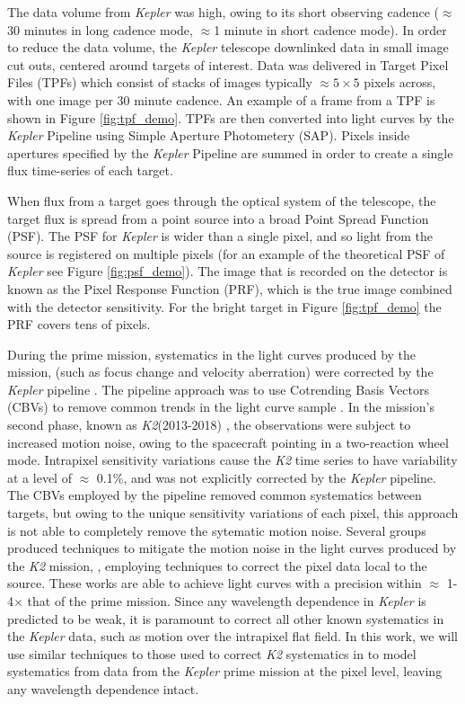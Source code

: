\documentclass[iop]{emulateapj}
\newcommand{\kepler}{\emph{Kepler}\xspace}
\newcommand{\ktwo}{\emph{K2}\xspace}
\begin{document}
The data volume from \kepler was high, owing to its short observing cadence ($\approx$30 minutes in long cadence mode, $\approx$1 minute in short cadence mode). In order to reduce the data volume, the \kepler telescope downlinked data in small image cut outs, centered around targets of interest. Data was delivered in Target Pixel Files (TPFs) which consist of stacks of images typically $\approx 5 \times 5$ pixels across, with one image per 30 minute cadence. An example of a frame from a TPF is shown in Figure \ref{fig:tpf_demo}. TPFs are then converted into light curves by the \kepler Pipeline \citep{pipeline} using Simple Aperture Photometery (SAP). Pixels inside apertures specified by the \kepler Pipeline are summed in order to create a single flux time-series of each target.

When flux from a target goes through the optical system of the telescope, the target flux is spread from a point source into a broad Point Spread Function (PSF). The PSF for \kepler is wider than a single pixel, and so light from the source is registered on multiple pixels (for an example of the theoretical PSF of \kepler see Figure \ref{fig:psf_demo}). The image that is recorded on the detector is known as the Pixel Response Function (PRF), which is the true image combined with the detector sensitivity. For the bright target in Figure \ref{fig:tpf_demo} the PRF covers tens of pixels. 

During the prime mission, systematics in the light curves produced by the mission, (such as focus change and velocity aberration) were corrected by the \kepler pipeline \citep[see Kepler Data Processing Handbook][]{kdph}. The pipeline approach was to use Cotrending Basis Vectors (CBVs) to remove common trends in the light curve sample \citep[see][]{jeff}. In the mission's second phase, known as \ktwo (2013-2018) \citep{howell}, the observations were subject to increased motion noise, owing to the spacecraft pointing in a two-reaction wheel mode. Intrapixel sensitivity variations cause the \ktwo time series to have variability at a level of $\approx$ 0.1\%, and was not explicitly corrected by the \kepler pipeline. The CBVs employed by the pipeline removed common systematics between targets, but owing to the unique sensitivity variations of each pixel, this approach is not able to completely remove the sytematic motion noise. Several groups produced techniques to mitigate the motion noise in the light curves produced by the \ktwo mission, \citep[e.g. See ][]{Vanderburg2014, Luger2016, Oxford}, employing techniques to correct the pixel data local to the source. These works are able to achieve light curves with a precision within $\approx$ 1-4$\times$ that of the prime mission. Since any wavelength dependence in \kepler is predicted to be weak, it is paramount to correct all other known systematics in the \kepler data, such as motion over the intrapixel flat field. In this work, we will use similar techniques to those used to correct \ktwo systematics in \cite{Luger2016} to model systematics from data from the \kepler prime mission at the pixel level, leaving any wavelength dependence intact.
\end{document}
